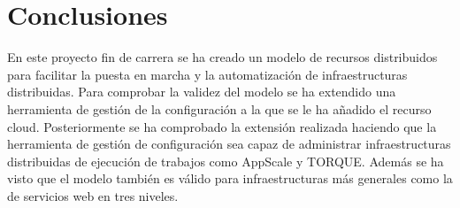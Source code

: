 \chapter{Conclusiones}
\label{cap:conclusiones}


En este proyecto fin de carrera se ha creado un modelo de recursos distribuidos para facilitar la puesta en marcha y la automatización de infraestructuras distribuidas. Para comprobar la validez del modelo se ha extendido una herramienta de gestión de la configuración a la que se le ha añadido el recurso cloud. Posteriormente se ha comprobado la extensión realizada haciendo que la herramienta de gestión de configuración sea capaz de administrar infraestructuras distribuidas de ejecución de trabajos como AppScale y TORQUE. Además se ha visto que el modelo también es válido para infraestructuras más generales como la de servicios web en tres niveles.
